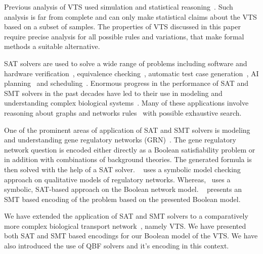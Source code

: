 \noindent Previous analysis of VTS used simulation and statistical reasoning~\cite{mani2016stacking}. 
%
Such analysis is far from complete and can only make statistical claims about the VTS based on a subset of samples. 
%
The properties of VTS discussed in this paper require precise analysis for all possible rules and variations, that make formal methods a suitable alternative.

SAT solvers are used to solve a wide range of problems including
%
software and hardware verification~\cite{biere1999symbolic1, biere1999symbolic2, bjesse2001finding, velev2003effective}, equivalence checking~\cite{goldberg2001using}, automatic test case generation~\cite{stephan1996combinational},
AI planning~\cite{kautz1996pushing} and scheduling~\cite{gomes1998randomization}. 
%
Enormous progress in the performance of SAT and SMT solvers
in the past decades have led to their use in modeling and understanding complex biological systems~\cite{heule2010exact,yordanov2013smt,mangla2010timing}. 
%
Many of these applications involve reasoning about graphs and networks rules~\cite{guerra2012reasoning,chin2008biographe} with possible exhaustive search.
%

One of the prominent areas of application of SAT and SMT solvers is modeling and understanding gene regulatory networks (GRN)~\cite{giacobbe2015model,rosenblueth2014inference, yordanov2016method, dunn2014defining, paoletti2014analyzing, koksal2013synthesis}.
%
The gene regulatory network question is encoded either directly as a Boolean satisfiability problem or in addition with combinations of background theories.
%
The generated formula is then solved with the help of a SAT solver. 
%
~\cite{rosenblueth2014inference} uses a symbolic model checking approach on qualitative
models of regulatory networks.
%
Whereas,~\cite{dunn2014defining} uses a symbolic, SAT-based approach on the Boolean network model. 
%
~\cite{giacobbe2015model, yordanov2016method} presents an SMT based encoding of the problem based on the presented Boolean model.
%

We have extended the application of SAT and SMT solvers to a comparatively more complex biological transport network~\cite{mani2016stacking}, namely VTS. 
%
We have presented both SAT and SMT based encodings for our Boolean model of the VTS.
%
We have also introduced the use of QBF solvers and it's encoding in this context.
% 

